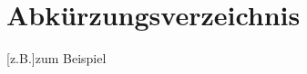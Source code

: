 \clearpage
\chapter*{Abkürzungsverzeichnis}\label{abkuerzungsverzeichnis}
\begin{acronym}[langesWort]  %
\setlength{\itemsep}{-\parsep}

[z.B.]{zum Beispiel}


\end{acronym}
